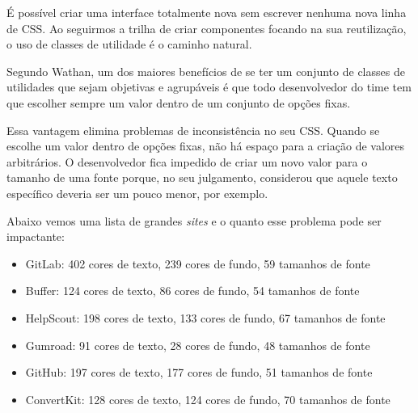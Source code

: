\begin{Shaded}
\begin{Highlighting}[]
\KeywordTok{>}  
    \KeywordTok{>}  
        \KeywordTok{>} 
\end{Highlighting}
\end{Shaded}

É possível criar uma interface totalmente nova sem escrever nenhuma nova
linha de CSS. Ao seguirmos a trilha de criar componentes focando na sua
reutilização, o uso de classes de utilidade é o caminho natural.

Segundo Wathan, um dos maiores benefícios de se ter um conjunto de
classes de utilidades que sejam objetivas e agrupáveis é que todo
desenvolvedor do time tem que escolher sempre um valor dentro de um
conjunto de opções fixas.

Essa vantagem elimina problemas de inconsistência no seu CSS. Quando se
escolhe um valor dentro de opções fixas, não há espaço para a criação de
valores arbitrários. O desenvolvedor fica impedido de criar um novo
valor para o tamanho de uma fonte porque, no seu julgamento, considerou
que aquele texto específico deveria ser um pouco menor, por exemplo.

Abaixo vemos uma lista de grandes \emph{sites} e o quanto esse problema
pode ser impactante\nocite{cssstats}:

\begin{itemize}
\tightlist
\item
  GitLab:
  402 cores de texto, 239 cores de fundo, 59 tamanhos de fonte
\item
  Buffer:
  124 cores de texto, 86 cores de fundo, 54 tamanhos de fonte
\item
  HelpScout:
  198 cores de texto, 133 cores de fundo, 67 tamanhos de fonte
\item
  Gumroad:
  91 cores de texto, 28 cores de fundo, 48 tamanhos de fonte
\item
  GitHub:
  197 cores de texto, 177 cores de fundo, 51 tamanhos de fonte
\item
  ConvertKit:
  128 cores de texto, 124 cores de fundo, 70 tamanhos de fonte
\end{itemize}

